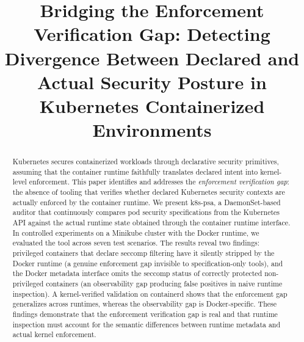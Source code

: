 \documentclass[conference]{IEEEtran}
\begin{document}
\title{Bridging the Enforcement Verification Gap: Detecting Divergence Between Declared and Actual Security Posture in Kubernetes Containerized Environments}

\author{
\and
{}
\and
{}
}

\maketitle

\begin{abstract}
Kubernetes secures containerized workloads through declarative security primitives, assuming that the container runtime faithfully translates declared intent into kernel-level enforcement. This paper identifies and addresses the \emph{enforcement verification gap}: the absence of tooling that verifies whether declared Kubernetes security contexts are actually enforced by the container runtime. We present k8s-psa, a DaemonSet-based auditor that continuously compares pod security specifications from the Kubernetes API against the actual runtime state obtained through the container runtime interface. In controlled experiments on a Minikube cluster with the Docker runtime, we evaluated the tool across seven test scenarios. The results reveal two findings: privileged containers that declare seccomp filtering have it silently stripped by the Docker runtime (a genuine enforcement gap invisible to specification-only tools), and the Docker metadata interface omits the seccomp status of correctly protected non-privileged containers (an observability gap producing false positives in naive runtime inspection). A kernel-verified validation on containerd shows that the enforcement gap generalizes across runtimes, whereas the observability gap is Docker-specific. These findings demonstrate that the enforcement verification gap is real and that runtime inspection must account for the semantic differences between runtime metadata and actual kernel enforcement.
\end{abstract}
\end{document}
